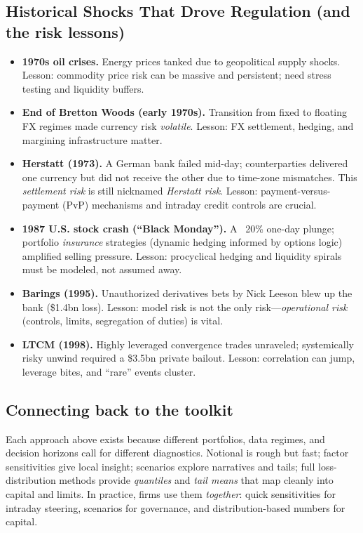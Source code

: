 \subsection*{Historical Shocks That Drove Regulation (and the risk lessons)}

\begin{itemize}
  \item \textbf{1970s oil crises.} Energy prices tanked due to geopolitical supply shocks. Lesson: commodity price risk can be massive and persistent; need stress testing and liquidity buffers.
  \item \textbf{End of Bretton Woods (early 1970s).} Transition from fixed to floating FX regimes made currency risk \emph{volatile}. Lesson: FX settlement, hedging, and margining infrastructure matter.
  \item \textbf{Herstatt (1973).} A German bank failed mid-day; counterparties delivered one currency but did not receive the other due to time-zone mismatches. This \emph{settlement risk} is still nicknamed \emph{Herstatt risk}. Lesson: payment-versus-payment (PvP) mechanisms and intraday credit controls are crucial.
  \item \textbf{1987 U.S. stock crash (``Black Monday'').} A ~20\% one-day plunge; portfolio \emph{insurance} strategies (dynamic hedging informed by options logic) amplified selling pressure. Lesson: procyclical hedging and liquidity spirals must be modeled, not assumed away.
  \item \textbf{Barings (1995).} Unauthorized derivatives bets by Nick Leeson blew up the bank (\$1.4bn loss). Lesson: model risk is not the only risk—\emph{operational risk} (controls, limits, segregation of duties) is vital.
  \item \textbf{LTCM (1998).} Highly leveraged convergence trades unraveled; systemically risky unwind required a \$3.5bn private bailout. Lesson: correlation can jump, leverage bites, and “rare” events cluster.
\end{itemize}

\subsection*{Connecting back to the toolkit}
Each approach above exists because different portfolios, data regimes, and decision horizons call for different diagnostics. Notional is rough but fast; factor sensitivities give local insight; scenarios explore narratives and tails; full loss-distribution methods provide \emph{quantiles} and \emph{tail means} that map cleanly into capital and limits. In practice, firms use them \emph{together}: quick sensitivities for intraday steering, scenarios for governance, and distribution-based numbers for capital.

